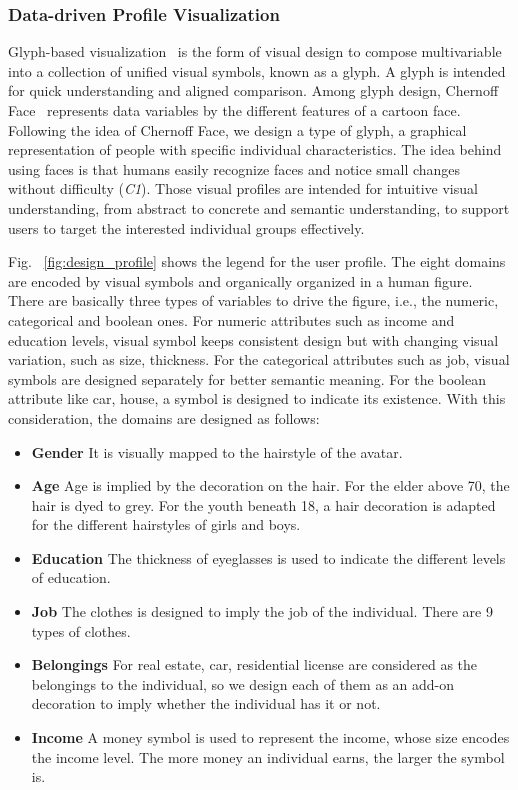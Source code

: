\documentclass{ieeeaccess}
\begin{document}
\subsubsection{Data-driven Profile Visualization}

Glyph-based visualization~\cite{borgo2013glyph} is the form of visual design to compose multivariable into a collection of unified visual symbols, known as a glyph. A glyph is intended for quick understanding and aligned comparison. Among glyph design, Chernoff Face~\cite{chernoff1973use} represents data variables by the different features of a cartoon face. Following the idea of Chernoff Face, we design a type of glyph, a graphical representation of people with specific individual characteristics. The idea behind using faces is that humans easily recognize faces and notice small changes without difficulty (\textit{C1}). Those visual profiles are intended for intuitive visual understanding, from abstract to concrete and semantic understanding, to support users to target the interested individual groups effectively.

Fig. ~\ref{fig:design_profile} shows the legend for the user profile. The eight domains are encoded by visual symbols and organically organized in a human figure. There are basically three types of variables to drive the figure, i.e., the numeric, categorical and boolean ones. For numeric attributes such as income and education levels, visual symbol keeps consistent design but with changing visual variation, such as size, thickness. For the categorical attributes such as job, visual symbols are designed separately for better semantic meaning. For the boolean attribute like car, house, a symbol is designed to indicate its existence. With this consideration, the domains are designed as follows:


\begin{itemize}
\item \textbf{Gender} It is visually mapped to the hairstyle of the avatar.
\item \textbf{Age} Age is implied by the decoration on the hair. For the elder above 70, the hair is dyed to grey. For the youth beneath 18, a hair decoration is adapted for the different hairstyles of girls and boys.
\item \textbf{Education} The thickness of eyeglasses is used to indicate the different levels of education.
\item \textbf{Job} The clothes is designed to imply the job of the individual. There are 9 types of clothes.
\item \textbf{Belongings} For real estate, car, residential license are considered as the belongings to the individual, so we design each of them as an add-on decoration to imply whether the individual has it or not.
\item \textbf{Income} A money symbol is used to represent the income, whose size encodes the income level. The more money an individual earns, the larger the symbol is.
\end{itemize}
\end{document}
